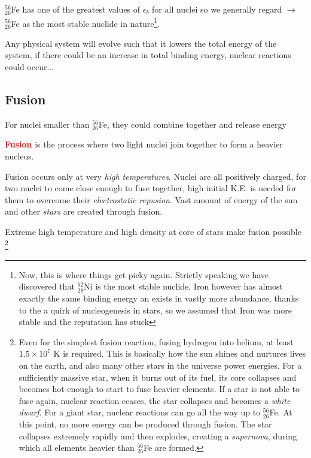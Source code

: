 \documentclass[a4paper,12pt]{book}
\newcommand{\piste}{{\fontencoding{U}\fontfamily{futs}\selectfont\char 49\relax}}
\newenvironment{ilight}
  {\centering
  	\vspace*{6pt}
  	\begin{tcolorbox}[colframe=Gray,colback=LightGrey!15]
  \setlength{\baselineskip}{\baselineskip}%
  }
  {\end{tcolorbox}\vspace*{-4pt}}
\newcommand{\keypoint}[1]{\textbf{\textcolor{red}{#1}}}
\newcommand{\ra}{\rightarrow}
\newcommand{\piste}{\textsuperscript{$\star$}}
\newcommand{\keypoint}[1]{\textbf{\textcolor{red}{#1}}}
\begin{document}
$^{56}_{26}$Fe has one of the greatest values of $\epsilon_b$ for all nuclei so we generally regard $\ra$ $^{56}_{26}$Fe as the most stable nuclide in nature\footnote{Now, this is where things get picky again. Strictly speaking we have discovered that $^{62}_{28}$Ni is the most stable nuclide, Iron however has almost exactly the same binding energy an exists in vastly more abundance, thanks to the a quirk of nucleogenesis in stars, so we assumed that Iron was more stable and the reputation has stuck}.

Any physical system will evolve such that it lowers the total energy of the system, if there could be an increase in total binding energy, nuclear reactions could occur...

\subsection{Fusion}

For nuclei smaller than $^{56}_{26}$Fe, they could combine together and release energy

\begin{ilight}
	\keypoint{Fusion} is the process where two light nuclei join together to form a heavier nucleus.
\end{ilight}

Fusion occurs only at very \emph{high temperatures}. Nuclei are all positively charged, for two nuclei to come close enough to fuse together, high initial K.E. is needed for them to overcome their \emph{electrostatic repusion}. Vast amount of energy of the sun and other \emph{stars} are created through fusion.

Extreme high temperature and high density at core of stars make fusion possible
\footnote{Even for the simplest fusion reaction, fusing hydrogen into helium, at least $1.5\times 10^7 \text{ K}$ is required. This is basically how the sun shines and nurtures lives on the earth, and also many other stars in the universe power energies. For a sufficiently massive star, when it burns out of its fuel, its core collapses and becomes hot enough to start to fuse heavier elements. If a star is not able to fuse again, nuclear reaction ceases, the star collapses and becomes a \emph{white dwarf}. For a giant star, nuclear reactions can go all the way up to $^{56}_{26}$Fe. At this point, no more energy can be produced through fusion. The star collapses extremely rapidly and then explodes, creating a \emph{supernova}, during which all elements heavier than $^{56}_{26}$Fe are formed. \piste}
\end{document}
